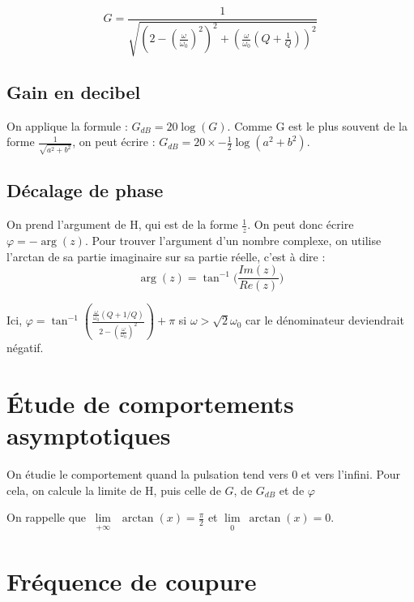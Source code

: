 \documentclass[french]{yLectureNote}
\newcommand{\Lim}[1]{\lim\limits_{\substack{#1}}\:}
\begin{document}
\[G = \frac{1}{\sqrt{(2-(\frac{\omega}{\omega_0})^2)^2 + (\frac{\omega}{\omega_0}(Q+\frac{1}{Q}))^2 }}\]

\subsection{Gain en decibel}
On applique la formule : $G_{dB} = 20\log(G)$. Comme G est le plus souvent de la forme $\frac{1}{\sqrt{a^2+b^2}}$, on peut écrire : $G_{dB} = 20\times -\frac{1}{2} \log(a^2+b^2)$.

\subsection{Décalage de phase}
On prend l'argument de H, qui est de la forme $\frac{1}{z}$. On peut donc écrire $\varphi = -\arg(z)$. Pour trouver l'argument d'un nombre complexe, on utilise l'arctan de sa partie imaginaire sur sa partie réelle, c'est à dire : \[\arg(z) = \tan^{-1}\big(\frac{Im(z)}{Re(z)}\big)\]

Ici, $\varphi = \tan^{-1}(\frac{\frac{\omega}{\omega_0}(Q+1/Q)}{2-(\frac{\omega}{\omega_0})^2}) + \pi$ si $\omega > \sqrt{2} \omega_0$ car le dénominateur deviendrait négatif.
\section{Étude de comportements asymptotiques}
On étudie le comportement quand la pulsation tend vers 0 et vers l'infini.
Pour cela, on calcule la limite de H, puis celle de $G$, de $G_{dB}$ et de $\varphi$

On rappelle que $\Lim{+\infty} \arctan(x) = \frac{\pi}{2}$ et $\Lim{0} \arctan(x) = 0$.

\section{Fréquence de coupure}
\end{document}

